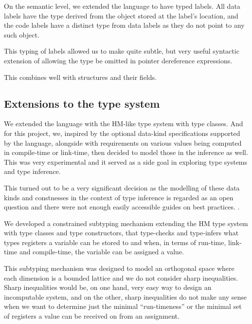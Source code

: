 On the semantic level, we extended the language to have typed labels. All data labels have the type derived from the object stored at the label's location, and the code labels have a distinct type from data labels as they do not point to any such object.

This typing of labels allowed us to make quite subtle, but very useful syntactic extension of allowing the type be omitted in pointer dereference expressions.


This combines well with structures and their fields.



\subsection{Extensions to the type system}

We extended the language with the HM-like type system with type classes. And for this project, we, inspired by the optional data-kind specifications supported by the \cmm language, alongside with requirements on various values being computed in compile-time or link-time, then decided to model those in the inference as well. This was very experimental and it served as a side goal in exploring type systems and type inference.

This turned out to be a very significant decision as the modelling of these data kinds and constnesses in the context of type inference is regarded as an open question and there were not enough easily accessible guides on best practices. .

We developed a constrained subtyping mechanism extending the HM type system with type classes and type constructors, that type-checks and type-infers what types registers a variable can be stored to and when, in terms of run-time, link-time and compile-time, the variable can be assigned a value.

This subtyping mechanism was designed to model an orthogonal space where each dimension is a bounded lattice and we do not consider sharp inequalities. Sharp inequalities would be, on one hand, very easy way to design an incomputable system, and on the other, sharp inequalities do not make any sense when we want to determine just the minimal ``run-timeness''  or the minimal set of registers a value can be received on from an assignment.

